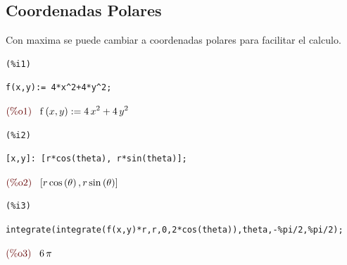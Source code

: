 \documentclass[12pt]{article}
\begin{document}
\subsection{Coordenadas Polares}
Con maxima se puede cambiar a coordenadas polares para facilitar el calculo.

\noindent
\begin{minipage}[t]{8ex}{\color{red}\bf
\begin{verbatim}
(%i1) 
\end{verbatim}}
\end{minipage}
\begin{minipage}[t]{\textwidth}{\color{blue}
\begin{verbatim}
f(x,y):= 4*x^2+4*y^2;
\end{verbatim}}
\end{minipage}
\begin{math}\displaystyle
\parbox{8ex}{\color{labelcolor}(\%o1) }
\mathrm{f}\left( x,y\right) :=4\,{x}^{2}+4\,{y}^{2}
\end{math}


\noindent
\begin{minipage}[t]{8ex}{\color{red}\bf
\begin{verbatim}
(%i2) 
\end{verbatim}}
\end{minipage}
\begin{minipage}[t]{\textwidth}{\color{blue}
\begin{verbatim}
[x,y]: [r*cos(theta), r*sin(theta)];
\end{verbatim}}
\end{minipage}
\begin{math}\displaystyle
\parbox{8ex}{\color{labelcolor}(\%o2) }
[r\,\mathrm{cos}\left( \theta\right) ,r\,\mathrm{sin}\left( \theta\right) ]
\end{math}


\noindent
\begin{minipage}[t]{8ex}{\color{red}\bf
\begin{verbatim}
(%i3) 
\end{verbatim}}
\end{minipage}
\begin{minipage}[t]{\textwidth}{\color{blue}
\begin{verbatim}
integrate(integrate(f(x,y)*r,r,0,2*cos(theta)),theta,-%pi/2,%pi/2);
\end{verbatim}}
\end{minipage}
\begin{math}\displaystyle
\parbox{8ex}{\color{labelcolor}(\%o3) }
6\,\pi 
\end{math}
\end{document}
